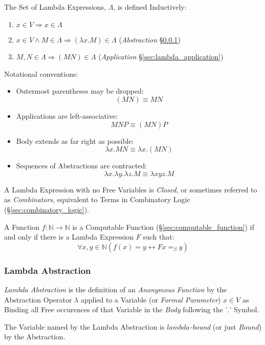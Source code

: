 The Set of Lambda Expressions, $\Lambda$, is defined Inductively:
\begin{enumerate}
  \item $x \in V \Rightarrow x \in \Lambda$
  \item $x \in V \wedge M \in \Lambda \Rightarrow (\lambda x.M) \in
    \Lambda$ (\emph{Abstraction} \S\ref{sec:lambda_abstraction})
  \item $M,N \in \Lambda \Rightarrow (M N) \in \Lambda$
    (\emph{Application} \S\ref{sec:lambda_application})
\end{enumerate}
Notational conventions:
\begin{itemize}
  \item Outermost parentheses may be dropped:
    \[
      (M N) \equiv M N
    \]
  \item Applications are left-associative:
    \[
      M N P \equiv (M N) P
    \]
  \item Body extends as far right as possible:
    \[
      \lambda x.M N \equiv \lambda x.(M N)
    \]
  \item Sequences of Abstractions are contracted:
    \[
      \lambda x.\lambda y.\lambda z.M \equiv
      \lambda xyz.M
    \]
\end{itemize}

A Lambda Expression with no Free Variables is \emph{Closed}, or
sometimes referred to as \emph{Combinators}, equivalent to Terms in
Combinatory Logic (\S\ref{sec:combinatory_logic}).

A Function $f : \mathbb{N} \rightarrow \mathbb{N}$ is a Computable
Function (\S\ref{sec:computable_function}) if and only if there is a
Lambda Expression $F$ such that:
\[
  \forall x,y \in \mathbb{N} (f(x)=y \leftrightarrow F x =_\beta y)
\]



\subsubsection{Lambda Abstraction}\label{sec:lambda_abstraction}

\emph{Lambda Abstraction} is the definition of an \emph{Anonymous
  Function} by the Abstraction Operator $\lambda$ applied to a
Variable (or \emph{Formal Parameter}) $x \in V$ as Binding all Free
occurences of that Variable in the \emph{Body} following the '$.$'
Symbol.

The Variable named by the Lambda Abstraction is \emph{$lambda$-bound}
(or just \emph{Bound}) by the Abstraction.



